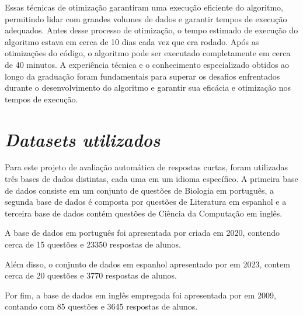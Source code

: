 Essas técnicas de otimização garantiram uma execução eficiente do algoritmo, permitindo lidar com grandes volumes de dados e garantir tempos de execução adequados. Antes desse processo de otimização, o tempo estimado de execução do algoritmo estava em cerca de 10 dias cada vez que era rodado. Após as otimizações do código, o algoritmo pode ser executado completamente em cerca de 40 minutos. A experiência técnica e o conhecimento especializado obtidos ao longo da graduação foram fundamentais para superar os desafios enfrentados durante o desenvolvimento do algoritmo e garantir sua eficácia e otimização nos tempos de execução.

\section{\textit{Datasets utilizados}}

Para este projeto de avaliação automática de respostas curtas, foram utilizadas três bases de dados distintas, cada uma em um idioma específico. A primeira base de dados consiste em um conjunto de questões de Biologia em português, a segunda base de dados é composta por questões de Literatura em espanhol e a terceira base de dados contém questões de Ciência da Computação em inglês.

A base de dados em português foi apresentada por \textcite{datasetPort} criada em 2020, contendo cerca de 15 questões e 23350 respostas de alunos.

Além disso, o conjunto de dados em espanhol apresentado por \textcite{datasetEsp} em 2023, contem cerca de 20 questões e 3770 respostas de alunos.

Por fim, a base de dados em inglês empregada foi apresentada por \textcite{datasetEng} em 2009, contando com 85 questões e 3645 respostas de alunos.








\newpage